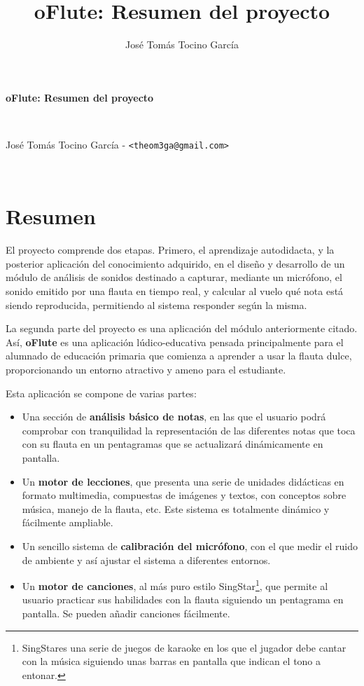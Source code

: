 \documentclass{article}
\title{oFlute: Resumen del proyecto}
\author{José Tomás Tocino García}
\date{}
\begin{document}
\pagestyle{empty}
\begin{center}
\begin{Large}\textbf{oFlute: Resumen del proyecto}\end{Large}\\
\begin{large}José Tomás Tocino García - \texttt{<theom3ga@gmail.com>}\end{large}\\[0.1cm]

 
\end{center}

\part*{Resumen}

El proyecto comprende dos etapas. Primero, el aprendizaje autodidacta,
y la posterior aplicación del conocimiento adquirido, en el diseño y
desarrollo de un módulo de análisis de sonidos destinado a capturar,
mediante un micrófono, el sonido emitido por una flauta en tiempo
real, y calcular al vuelo qué nota está siendo reproducida,
permitiendo al sistema responder según la misma.

La segunda parte del proyecto es una aplicación del módulo
anteriormente citado. Así, \textbf{oFlute} es una aplicación
lúdico-educativa pensada principalmente para el alumnado de educación
primaria que comienza a aprender a usar la flauta dulce,
proporcionando un entorno atractivo y ameno para el estudiante.

Esta aplicación se compone de varias partes:
\begin{itemize}
\item Una sección de \textbf{análisis básico de notas}, en las que el usuario
  podrá comprobar con tranquilidad la representación de las diferentes
  notas que toca con su flauta en un pentagramas que se actualizará
  dinámicamente en pantalla.
\item Un \textbf{motor de lecciones}, que presenta una serie de unidades
  didácticas en formato multimedia, compuestas de imágenes y textos,
  con conceptos sobre música, manejo de la flauta, etc. Este sistema
  es totalmente dinámico y fácilmente ampliable.
\item Un sencillo sistema de \textbf{calibración del micrófono}, con el que
  medir el ruido de ambiente y así ajustar el sistema a diferentes
  entornos.
\item Un \textbf{motor de canciones}, al más puro estilo
  SingStar\textregistered \footnote{SingStar\textregistered es una
    serie de juegos de karaoke en los que el jugador debe cantar con
    la música siguiendo unas barras en pantalla que indican el tono a
    entonar.}, que permite al usuario practicar sus habilidades con la
  flauta siguiendo un pentagrama en pantalla. Se pueden añadir
  canciones fácilmente.
\end{itemize}
\end{document}
